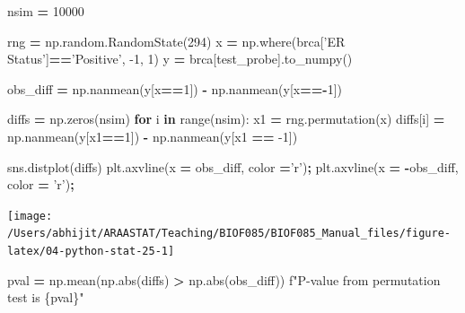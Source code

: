 \documentclass[
  letterpaper,
]{scrbook}
\newenvironment{Shaded}{\begin{snugshade}}{\end{snugshade}}
\newcommand{\BuiltInTok}[1]{#1}
\newcommand{\ControlFlowTok}[1]{\textcolor[rgb]{0.13,0.29,0.53}{\textbf{#1}}}
\newcommand{\DecValTok}[1]{\textcolor[rgb]{0.00,0.00,0.81}{#1}}
\newcommand{\KeywordTok}[1]{\textcolor[rgb]{0.13,0.29,0.53}{\textbf{#1}}}
\newcommand{\NormalTok}[1]{#1}
\newcommand{\OperatorTok}[1]{\textcolor[rgb]{0.81,0.36,0.00}{\textbf{#1}}}
\newcommand{\SpecialCharTok}[1]{\textcolor[rgb]{0.00,0.00,0.00}{#1}}
\newcommand{\SpecialStringTok}[1]{\textcolor[rgb]{0.31,0.60,0.02}{#1}}
\newcommand{\StringTok}[1]{\textcolor[rgb]{0.31,0.60,0.02}{#1}}
\begin{document}
\begin{Shaded}
\begin{Highlighting}[]
\NormalTok{nsim }\OperatorTok{=} \DecValTok{10000}

\NormalTok{rng }\OperatorTok{=}\NormalTok{ np.random.RandomState(}\DecValTok{294}\NormalTok{)}
\NormalTok{x }\OperatorTok{=}\NormalTok{ np.where(brca[}\StringTok{'ER Status'}\NormalTok{]}\OperatorTok{==}\StringTok{'Positive'}\NormalTok{, }\DecValTok{-1}\NormalTok{, }\DecValTok{1}\NormalTok{)}
\NormalTok{y }\OperatorTok{=}\NormalTok{ brca[test_probe].to_numpy()}

\NormalTok{obs_diff }\OperatorTok{=}\NormalTok{ np.nanmean(y[x}\OperatorTok{==}\DecValTok{1}\NormalTok{]) }\OperatorTok{-}\NormalTok{ np.nanmean(y[x}\OperatorTok{==-}\DecValTok{1}\NormalTok{])}

\NormalTok{diffs }\OperatorTok{=}\NormalTok{ np.zeros(nsim)}
\ControlFlowTok{for}\NormalTok{ i }\KeywordTok{in} \BuiltInTok{range}\NormalTok{(nsim):}
\NormalTok{    x1 }\OperatorTok{=}\NormalTok{ rng.permutation(x)}
\NormalTok{    diffs[i] }\OperatorTok{=}\NormalTok{ np.nanmean(y[x1}\OperatorTok{==}\DecValTok{1}\NormalTok{]) }\OperatorTok{-}\NormalTok{ np.nanmean(y[x1 }\OperatorTok{==} \DecValTok{-1}\NormalTok{])}
\end{Highlighting}
\end{Shaded}

\begin{Shaded}
\begin{Highlighting}[]
\NormalTok{sns.distplot(diffs)}
\NormalTok{plt.axvline(x }\OperatorTok{=}\NormalTok{ obs_diff, color }\OperatorTok{=}\StringTok{'r'}\NormalTok{)}\OperatorTok{;}
\NormalTok{plt.axvline(x }\OperatorTok{=} \OperatorTok{-}\NormalTok{obs_diff, color }\OperatorTok{=} \StringTok{'r'}\NormalTok{)}\OperatorTok{;}
\end{Highlighting}
\end{Shaded}

\begin{center}\texttt{[image: /Users/abhijit/ARAASTAT/Teaching/BIOF085/BIOF085\_Manual\_files/figure-latex/04-python-stat-25-1]} \end{center}

\begin{Shaded}
\begin{Highlighting}[]
\NormalTok{pval }\OperatorTok{=}\NormalTok{ np.mean(np.}\BuiltInTok{abs}\NormalTok{(diffs) }\OperatorTok{>}\NormalTok{ np.}\BuiltInTok{abs}\NormalTok{(obs_diff))}
\SpecialStringTok{f"P-value from permutation test is }\SpecialCharTok{\{}\NormalTok{pval}\SpecialCharTok{\}}\SpecialStringTok{"}
\end{Highlighting}
\end{Shaded}
\end{document}
